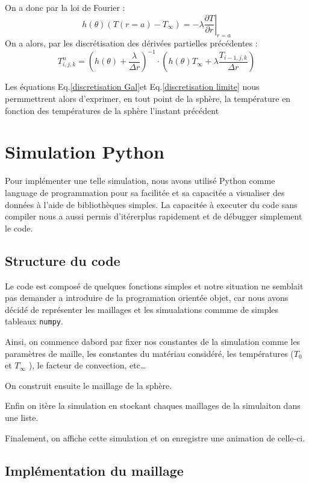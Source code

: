 \documentclass[fleqn]{article}
\begin{document}
On a donc par la loi de Fourier :
\begin{equation}
    h(\theta)(T(r = a) - T_\infty) = -\lambda \left.\frac{ \partial T}{\partial r}\right|_{r=a} 
\end{equation}
On a alors, par les discrétisation des dérivées partielles précédentes :
\begin{equation}
    T_{i,j,k}^n = \left(h(\theta) + \frac{\lambda}{\Delta r}\right)^{-1} \cdot \left( h(\theta) T_\infty + \lambda \frac{T_{i-1,j,k}}{\Delta r}\right)
    \label{discretisation limite}
\end{equation}

Les équations Eq.\eqref{discretisation Gal}et Eq.\eqref{discretisation limite} nous permmettrent alors d'exprimer, en tout point de la sphère, la température en fonction des températures de la sphère l'instant précédent




\newpage
\section{Simulation Python} 
Pour implémenter une telle simulation, nous avons utilisé Python comme language de programmation pour sa facilitée et sa capacitée a visualiser des données à l'aide de bibliothèques simples. La capacitée à executer du code sans compiler nous a aussi permis d'itérerplus rapidement et de débugger simplement le code.
\subsection{Structure du code}
Le code est composé de quelques fonctions simples et notre situation ne semblait pas demander a introduire de la programation orientée objet, car nous avons décidé de représenter les maillages et les simualations commme de simples tableaux \texttt{numpy}. 

Ainsi, on commence dabord par fixer nos constantes de la simulation comme les paramètres de maille, les constantes du matériau considéré, les températures ($T_0$ et $T_\infty$ ), le facteur de convection, etc\dots

On construit ensuite le maillage de la sphère.

Enfin on itère la simulation en stockant chaques maillages de la simulaiton dans une liste.

Finalement, on affiche cette simulation et on enregistre une animation de celle-ci.

\subsection{Implémentation du maillage}
\end{document}
